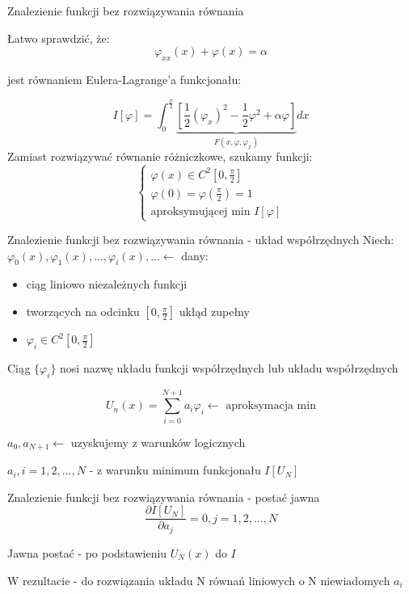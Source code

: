
	\begin{frame}{Znalezienie funkcji bez rozwiązywania równania}
	
		Łatwo sprawdzić, że:
		$$
		\varphi_{xx}(x) + \varphi(x) = \alpha
		$$
				
		jest równaniem Eulera-Lagrange'a funkcjonału:
				
		$$
		I[\varphi] = \int_0^{\frac{\pi}{2}} \underbrace{[\frac{1}{2}(\varphi_x)^2 - \frac{1}{2}\varphi^2 + \alpha \varphi]}_{F(x,\varphi, \varphi_x)} dx
		$$
		Zamiast rozwiązywać równanie różniczkowe, szukamy funkcji:
		$$
		\begin{cases}
			\varphi(x) \in C^2[0, \frac{\pi}{2}] \\
			\varphi(0) = \varphi(\frac{\pi}{2}) = 1 \\
			\text{aproksymującej min } I[\varphi]
		\end{cases}
		$$		
	\end{frame}
	

	\begin{frame}{Znalezienie funkcji bez rozwiązywania równania - układ współrzędnych}
		Niech: $\varphi_0(x), \varphi_1(x), ... , \varphi_i(x), ... \leftarrow$ dany:
			\begin{itemize}
				\item ciąg liniowo niezależnych funkcji
				\item tworzących na odcinku $[0, \frac{\pi}{2}]$ ukłąd zupełny
				\item $\varphi_i \in C^2 [0, \frac{\pi}{2}]$
			\end{itemize}
			
			Ciąg $\{\varphi_i\}$ nosi nazwę układu funkcji współrzędnych lub układu współrzędnych
			
			$$
			U_n(x) = \sum_{i=0}^{N+1} a_i \varphi_i \leftarrow \text{ aproksymacja min}
			$$
			
			$a_0, a_{N+1} \leftarrow$ uzyskujemy z warunków logicznych
			
			$a_i, i = 1,2, ... , N$ - z warunku minimum funkcjonału $I[U_N]$
	
	\end{frame}

	
	\begin{frame}{Znalezienie funkcji bez rozwiązywania równania - postać jawna}
		$$
		\frac{\partial I[U_N]}{\partial a_j} = 0, j = 1,2, ... , N
		$$
					
		Jawna postać - po podstawieniu $U_N(x)$ do $I$
					
		W rezultacie - do rozwiązania układu N równań liniowych o N niewiadomych $a_i$
					
	\end{frame}

